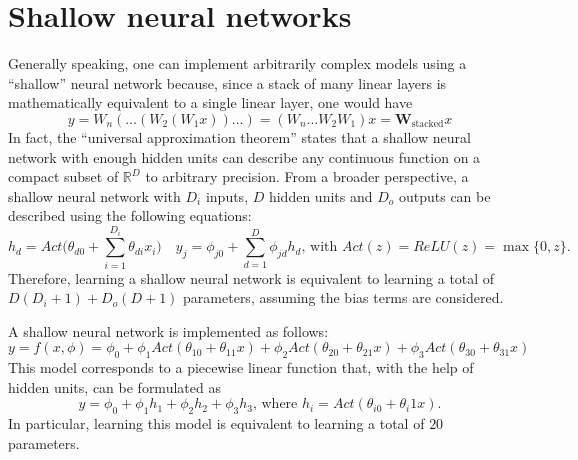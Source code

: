 \documentclass{report}
\begin{document}
\section{Shallow neural networks}
Generally speaking, one can implement arbitrarily complex models using a ``shallow'' neural network because, since a stack of many linear layers is mathematically equivalent to a single linear layer, one would have
\[y = W_n(\dots(W_2(W_1x))\dots) = (W_n\dots W_2W_1)x = \mathbf{W}_{\text{stacked}}x\]
In fact, the ``universal approximation theorem'' states that a shallow neural network with enough hidden units can describe any continuous function on a compact subset of $\displaystyle \mathbb{R}^D$ to arbitrary precision. \newline
From a broader perspective, a shallow neural network with $\displaystyle D_i$ inputs, $\displaystyle D$ hidden units and $\displaystyle D_o$ outputs can be described using the following equations:
\[h_d = Act\Bigg(\theta_{d0} + \sum_{i = 1}^{D_i} \theta_{di}x_i\Bigg) \quad y_j = \phi_{j0} + \sum_{d = 1}^D \phi_{jd}h_d \text{, with $Act(z) = ReLU(z) = \max\{0, z\}$.}\]
Therefore, learning a shallow neural network is equivalent to learning a total of $\displaystyle D(D_i + 1) + D_o(D + 1)$ parameters, assuming the bias terms are considered.
\begin{examplebox}
    A shallow neural network is implemented as follows:
    \[y = f(x, \phi) = \phi_0 + \phi_1Act(\theta_{10} + \theta_{11}x) + \phi_2Act(\theta_{20} + \theta_{21}x) + \phi_3Act(\theta_{30} + \theta_{31}x)\]
    This model corresponds to a piecewise linear function that, with the help of hidden units, can be formulated as
    \[y = \phi_0 + \phi_1h_1 + \phi_2h_2 + \phi_3h_3 \text{, where $h_i = Act(\theta_{i0} + \theta_i1x)$.}\]
    In particular, learning this model is equivalent to learning a total of $\displaystyle 20$ parameters.
\end{examplebox}
\end{document}
